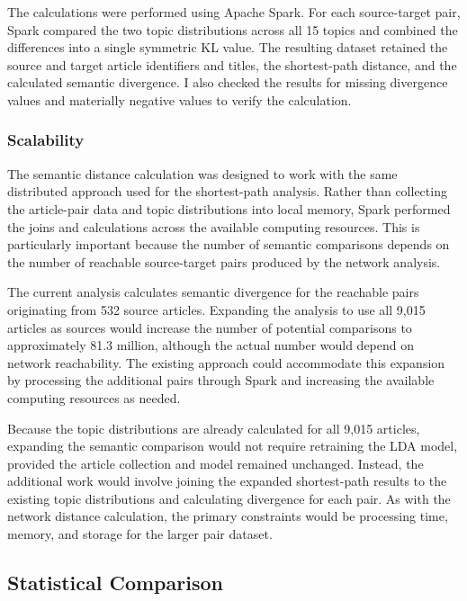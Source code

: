 \documentclass[
  letterpaper,
  DIV=11,
  numbers=noendperiod]{scrartcl}
\begin{document}
The calculations were performed using Apache Spark. For each
source-target pair, Spark compared the two topic distributions across
all 15 topics and combined the differences into a single symmetric KL
value. The resulting dataset retained the source and target article
identifiers and titles, the shortest-path distance, and the calculated
semantic divergence. I also checked the results for missing divergence
values and materially negative values to verify the calculation.

\subsubsection{Scalability}\label{scalability-2}

The semantic distance calculation was designed to work with the same
distributed approach used for the shortest-path analysis. Rather than
collecting the article-pair data and topic distributions into local
memory, Spark performed the joins and calculations across the available
computing resources. This is particularly important because the number
of semantic comparisons depends on the number of reachable source-target
pairs produced by the network analysis.

The current analysis calculates semantic divergence for the reachable
pairs originating from 532 source articles. Expanding the analysis to
use all 9,015 articles as sources would increase the number of potential
comparisons to approximately 81.3 million, although the actual number
would depend on network reachability. The existing approach could
accommodate this expansion by processing the additional pairs through
Spark and increasing the available computing resources as needed.

Because the topic distributions are already calculated for all 9,015
articles, expanding the semantic comparison would not require retraining
the LDA model, provided the article collection and model remained
unchanged. Instead, the additional work would involve joining the
expanded shortest-path results to the existing topic distributions and
calculating divergence for each pair. As with the network distance
calculation, the primary constraints would be processing time, memory,
and storage for the larger pair dataset.

\subsection{Statistical Comparison}\label{statistical-comparison}
\end{document}
